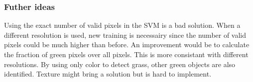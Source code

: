 \subsubsection{Futher ideas}
\npar
Using the exact number of valid pixels in the SVM is a bad solution. When a different resolution is used, new training
is necessairy since the number of valid pixels could be much higher than before. An improvement would be to calculate
the fraction of green pixels over all pixels. This is more consistant with different resolutions.
By using only color to detect grass, other green objects are also identified. Texture might bring a solution but is hard to implement.